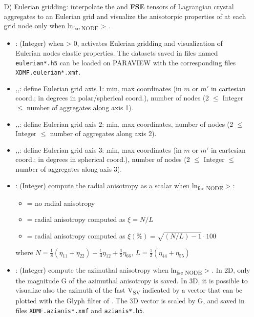 D) Eulerian gridding: interpolate the \pmb{$\eta$} and \textbf{FSE} tensors of Lagrangian crystal aggregates to an Eulerian grid and visualize the anisotorpic properties of \pmb{$\eta$} at each grid node only when ln\textsubscript{fse NODE} > .

\begin{itemize}
    \item {}: (Integer) when > 0, activates Eulerian gridding and visualization of Eulerian nodes elastic properties. The datasets saved in files named \texttt{eulerian*.h5} can be loaded on PARAVIEW with the corresponding files \texttt{XDMF.eulerian*.xmf}.

	\item {},,: define Eulerian grid axis 1: min, max coordinates (in $m$ or $m'$ in cartesian coord.; in degrees in polar/spherical coord.), number of nodes (2 $\leq$ Integer $\leq$ number of aggregates along axis 1).  
	\item {},,: define Eulerian grid axis 2: min, max coordinates, number of nodes (2 $\leq$ Integer $\leq$ number of aggregates along axis 2).  
	\item {},,: define Eulerian grid axis 3: min, max coordinates (in $m$ or $m'$ in cartesian coord.; in degrees in spherical coord.), number of nodes (2 $\leq$ Integer $\leq$ number of aggregates along axis 3).  
	
	\item {}: (Integer) compute the radial anisotropy as a scalar when ln\textsubscript{fse NODE} > :

    \begin{itemize}
        \item[]  = no radial anisotropy
        \item[]  = radial anisotropy computed as $\xi=N/L$
        \item[]  = radial anisotropy computed as $\xi(\%)=\sqrt{(N/L)-1}\cdot100$
    \end{itemize}
    where
    $N=\frac{1}{8} (\eta_{11}+\eta_{22} )-\frac{1}{4} \eta_{12}+\frac{1}{2} \eta_{66}$,
    $L=\frac{1}{2} (\eta_{44}+\eta_{55})$
    
	\item {}: (Integer) compute the azimuthal anisotropy when ln\textsubscript{fse NODE} > . In 2D, only the magnitude G of the azimuthal anisotropy is saved. In 3D, it is possible to visualize also the azimuth of the fast V\textsubscript{SV} indicated by a vector that can be plotted with the Glyph filter of \paraviewtitle{}. The 3D vector is scaled by G, and saved in files \texttt{XDMF.azianis*.xmf} and \texttt{azianis*.h5}.


\end{itemize}
